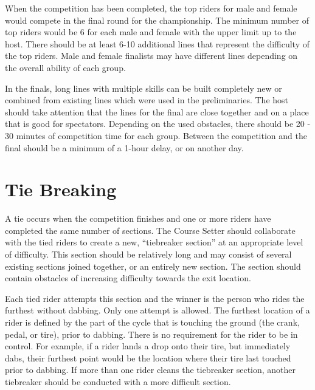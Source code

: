 When the competition has been completed, the top riders for male and female would compete in the final round for the championship.
The minimum number of top riders would be 6 for each male and female with the upper limit up to the host.
There should be at least 6-10 additional lines that represent the difficulty of the top riders.
Male and female finalists may have different lines depending on the overall ability of each group.

In the finals, long lines with multiple skills can be built completely new or combined from existing lines which were used in the preliminaries.
The host should take attention that the lines for the final are close together and on a place that is good for spectators.
Depending on the used obstacles, there should be 20 - 30 minutes of competition time for each group.
Between the competition and the final should be a minimum of a 1-hour delay, or on another day.
 
\section{Tie Breaking}
A tie occurs when the competition finishes and one or more riders have completed the same number of sections.
The Course Setter should collaborate with the tied riders to create a new, ``tiebreaker section'' at an appropriate level of difficulty.
This section should be relatively long and may consist of several existing sections joined together, or an entirely new section.
The section should contain obstacles of increasing difficulty towards the exit location.

Each tied rider attempts this section and the winner is the person who rides the furthest without dabbing.
Only one attempt is allowed.
The furthest location of a rider is defined by the part of the cycle that is touching the ground (the crank, pedal, or tire), prior to dabbing.
There is no requirement for the rider to be in control.
For example, if a rider lands a drop onto their tire, but immediately dabs, their furthest point would be the location where their tire last touched prior to dabbing.
If more than one rider cleans the tiebreaker section, another tiebreaker should be conducted with a more difficult section.
